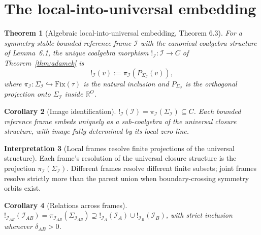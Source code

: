 \documentclass[11pt]{article}
\theoremstyle{plain}
\newtheorem{theorem}{Theorem}[section]
\newtheorem{corollary}[theorem]{Corollary}
\theoremstyle{definition}
\newtheorem{interpretation}[theorem]{Interpretation}
\theoremstyle{remark}
\newcommand{\Ical}{\mathcal{I}}
\newcommand{\Fix}{\mathrm{Fix}}
\begin{document}
\section{The local-into-universal embedding}\label{sec:embedding}

\begin{theorem}[Algebraic local-into-universal embedding, \citet{AlgebraicExistence} Theorem 6.3]\label{thm:embedding}
For a symmetry-stable bounded reference frame $\Ical$ with the canonical coalgebra structure of \citet{AlgebraicExistence} Lemma~6.1, the unique coalgebra morphism $!_\Ical: \Ical \to C$ of Theorem~\ref{thm:adamek} is
\begin{equation}\label{eq:embedding-formula}
  !_\Ical(v) := \pi_\Ical(P_{\Sigma_\Ical}(v)),
\end{equation}
where $\pi_\Ical: \Sigma_\Ical \hookrightarrow \Fix(\tau)$ is the natural inclusion and $P_{\Sigma_\Ical}$ is the orthogonal projection onto $\Sigma_\Ical$ inside $\mathbb{R}^O$.
\end{theorem}

\begin{corollary}[Image identification]\label{cor:image-id}
$!_\Ical(\Ical) = \pi_\Ical(\Sigma_\Ical) \subseteq C$. Each bounded reference frame embeds uniquely as a sub-coalgebra of the universal closure structure, with image fully determined by its local zero-line.
\end{corollary}

\begin{interpretation}[Local frames resolve finite projections of the universal structure]\label{int:local-into-universal}
Each frame's resolution of the universal closure structure is the projection $\pi_\Ical(\Sigma_\Ical)$. Different frames resolve different finite subsets; joint frames resolve strictly more than the parent union when boundary-crossing symmetry orbits exist.
\end{interpretation}

\begin{corollary}[Relations across frames]\label{cor:relations-cross-frames}
$!_{\Ical_{AB}}(\Ical_{AB}) = \pi_{\Ical_{AB}}(\Sigma_{\Ical_{AB}}) \supseteq !_{\Ical_A}(\Ical_A) \cup !_{\Ical_B}(\Ical_B)$, with strict inclusion whenever $\delta_{AB} > 0$.
\end{corollary}

\end{document}
